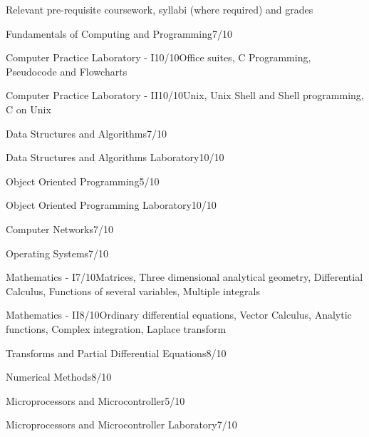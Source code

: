 \documentclass{resume} %
\begin{document}
\begin{rSection}{Relevant pre-requisite coursework, syllabi (where required) and grades}

\begin{rSubsection}{Fundamentals of Computing and Programming}{7/10}{}{}
\end{rSubsection}
\begin{rSubsection}{Computer Practice Laboratory - I}{10/10}{Office suites, C Programming, Pseudocode and Flowcharts}{}
\end{rSubsection}
\begin{rSubsection}{Computer Practice Laboratory - II}{10/10}{Unix, Unix Shell and Shell programming, C on Unix}{}
\end{rSubsection}
\begin{rSubsection}{Data Structures and Algorithms}{7/10}{}{}
\end{rSubsection}
\begin{rSubsection}{Data Structures and Algorithms Laboratory}{10/10}{}{}
\end{rSubsection}
\begin{rSubsection}{Object Oriented Programming}{5/10}{}{}
\end{rSubsection}
\begin{rSubsection}{Object Oriented Programming Laboratory}{10/10}{}{}
\end{rSubsection}
\begin{rSubsection}{Computer Networks}{7/10}{}{}
\end{rSubsection}
\begin{rSubsection}{Operating Systems}{7/10}{}{}
\end{rSubsection}
\begin{rSubsection}{Mathematics - I}{7/10}{Matrices, Three dimensional analytical geometry, Differential Calculus, Functions of several variables, Multiple integrals}{}{}
\end{rSubsection}
\begin{rSubsection}{Mathematics - II}{8/10}{Ordinary differential equations, Vector Calculus, Analytic functions, Complex integration, Laplace transform}{}{}
\end{rSubsection}
\begin{rSubsection}{Transforms and Partial Differential Equations}{8/10}{}{}
\end{rSubsection}
\begin{rSubsection}{Numerical Methods}{8/10}{}{}
\end{rSubsection}
\begin{rSubsection}{Microprocessors and Microcontroller}{5/10}{}{}
\end{rSubsection}
\begin{rSubsection}{Microprocessors and Microcontroller Laboratory}{7/10}{}{}
\end{rSubsection}

\end{rSection}
\fi
\end{document}
